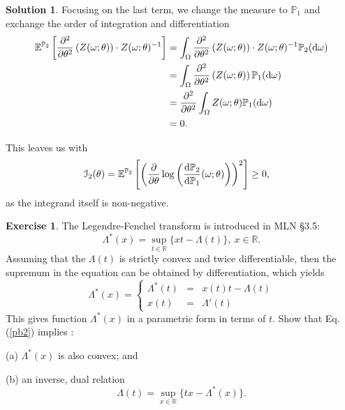 \documentclass[12pt]{article}
\newcommand{\Prob}{\mathbb{P}}
\newcommand{\Expect}{\mathbb{E}}
\def\rd{{\rm d}}
\theoremstyle{definition}
\newtheorem{exer}{Exercise}
\newtheorem{sol}{Solution}
\theoremstyle{remark}
\begin{document}
\begin{sol}
Focusing on the last term, we change the measure to $\Prob_{1}$ and exchange the order of integration and differentiation
\begin{align*}
    \Expect^{\Prob_{2}} \left[\frac{\partial^{2}}{\partial\theta^{2}} \left(Z(\omega; \theta) \right) \cdot Z(\omega; \theta)^{-1} \right] &= \int_{\Omega} \frac{\partial^{2}}{\partial\theta^{2}} \left(Z(\omega; \theta) \right) \cdot Z(\omega; \theta)^{-1} \Prob_{2}(\rd \omega)\\
                                                                                                                                           &= \int_{\Omega} \frac{\partial^{2}}{\partial\theta^{2}} \left(Z(\omega; \theta) \right) \Prob_{1}(\rd \omega) \\
                                                                                                                                           &= \frac{\partial^{2}}{\partial\theta^{2}} \int_{\Omega}  Z(\omega; \theta) \Prob_{1}(\rd \omega) \\
                                                                                                                                           &= 0.
\end{align*}

This leaves us with 
\begin{align*}
\mathcal{I}_2(\theta) &= \mathbb{E}^{\mathbb{P}_2}\left[ \left(  \frac{\partial}{\partial\theta} \log \left(\frac{\rd\mathbb{P}_2}{\rd\mathbb{P}_1}(\omega;\theta)\right)  \right)^{2}   \right]  \geq 0,
\end{align*}
as the integrand itself is non-negative.
\end{sol}

\newpage

\begin{exer}
The Legendre-Fenchel transform is introduced in MLN \S3.5:
\[
     \Lambda^*(x)  = \sup_{t\in\mathbb{R}}
      \big\{ xt - \Lambda(t)\big\}, \   x\in\mathbb{R}.
\]
Assuming that the $\Lambda(t)$ is strictly convex and twice
differentiable, then the supremum in the equation can be 
obtained by differentiation, which yields
\begin{equation}
     \Lambda^*(x) = \left\{\begin{array}{ccl}
                  \Lambda^*(t) &=& x(t) t - \Lambda(t) \\[5pt]
                  x(t) &=& \Lambda'(t)
                    \end{array}\right.
\label{pb2}
\end{equation}
This gives function $\Lambda^*(x)$ in a parametric form in
terms of $t$.  Show that Eq. (\ref{pb2}) implies :

(a) $\Lambda^*(x)$ is also convex; and 

(b) an inverse, dual relation
\[
       \Lambda(t) = \sup_{x\in\mathbb{R}}\big\{
                       tx - \Lambda^*(x) \big\}.
\]
\end{exer}
\end{document}

